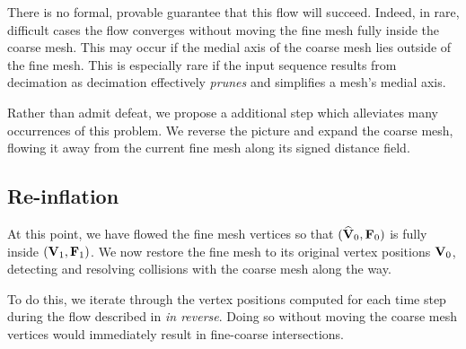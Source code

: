 There is no formal, provable guarantee that this flow will succeed. Indeed, in
rare, difficult cases the flow converges without moving the fine mesh fully
inside the coarse mesh. This may occur if the medial axis of the coarse mesh
lies outside of the fine mesh. This is especially rare if the input sequence
results from decimation as decimation effectively \emph{prunes} and simplifies
a mesh's medial axis.

Rather than admit defeat, we propose a additional step which alleviates many
occurrences of this problem. We reverse the picture and expand the coarse mesh,
flowing it away from the current fine mesh along its signed distance field.







\subsection{Re-inflation}
\label{sec:reinflation}

At this point, we have flowed the fine mesh vertices so that
$(\widehat{\mathbf{V}}_0,\mathbf{F}_0)$ is fully inside $(\mathbf{V}_1,\mathbf{F}_1)$. We now restore the fine
mesh to its original vertex positions $\mathbf{V}_0$, detecting and resolving collisions with
the coarse mesh along the way.

To do this, we iterate through the vertex positions computed for each time step
during the flow described in  \emph{in reverse}.
%
Doing so without moving the coarse mesh vertices would immediately result in
fine-coarse intersections.


